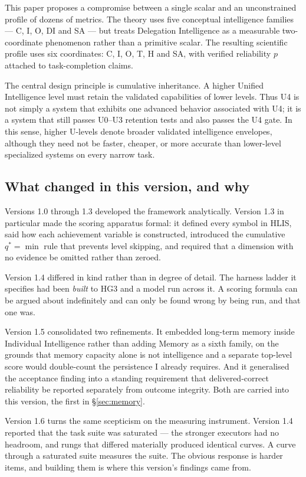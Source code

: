 \documentclass[11pt]{article}
\theoremstyle{definition}
\begin{document}
This paper proposes a compromise between a single scalar and an unconstrained profile of dozens of metrics. The theory uses five conceptual intelligence families --- C, I, O, DI and SA --- but treats Delegation Intelligence as a measurable two-coordinate phenomenon rather than a primitive scalar. The resulting scientific profile uses six coordinates: C, I, O, T, H and SA, with verified reliability $p$ attached to task-completion claims.

The central design principle is cumulative inheritance. A higher Unified Intelligence level must retain the validated capabilities of lower levels. Thus U4 is not simply a system that exhibits one advanced behavior associated with U4; it is a system that still passes U0--U3 retention tests and also passes the U4 gate. In this sense, higher U-levels denote broader validated intelligence envelopes, although they need not be faster, cheaper, or more accurate than lower-level specialized systems on every narrow task.

\subsection{What changed in this version, and why}

Versions 1.0 through 1.3 developed the framework analytically. Version 1.3 in particular made the scoring apparatus formal: it defined every symbol in HLIS, said how each achievement variable is constructed, introduced the cumulative $q^{*}=\min$ rule that prevents level skipping, and required that a dimension with no evidence be omitted rather than zeroed.

Version 1.4 differed in kind rather than in degree of detail. The harness ladder it specifies had been \emph{built} to HG3 and a model run across it. A scoring formula can be argued about indefinitely and can only be found wrong by being run, and that one was.

Version 1.5 consolidated two refinements. It embedded long-term memory inside Individual Intelligence rather than adding Memory as a sixth family, on the grounds that memory capacity alone is not intelligence and a separate top-level score would double-count the persistence I already requires. And it generalised the acceptance finding into a standing requirement that delivered-correct reliability be reported separately from outcome integrity. Both are carried into this version, the first in \S\ref{sec:memory}.

Version 1.6 turns the same scepticism on the measuring instrument. Version 1.4 reported that the task suite was saturated --- the stronger executors had no headroom, and rungs that differed materially produced identical curves. A curve through a saturated suite measures the suite. The obvious response is harder items, and building them is where this version's findings came from.
\end{document}
